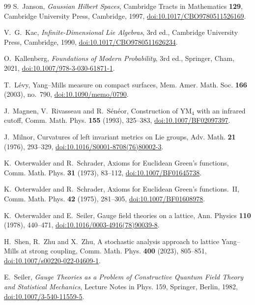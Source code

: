 \begin{thebibliography}{99}
S.~Janson, \emph{Gaussian Hilbert Spaces}, Cambridge Tracts in Mathematics
\textbf{129}, Cambridge University Press, Cambridge, 1997,
\href{https://doi.org/10.1017/CBO9780511526169}{doi:10.1017/CBO9780511526169}.

V.~G.~Kac, \emph{Infinite-Dimensional Lie Algebras}, 3rd ed., Cambridge University Press, Cambridge, 1990, \href{https://doi.org/10.1017/CBO9780511626234}{doi:10.1017/CBO9780511626234}.

O.~Kallenberg, \emph{Foundations of Modern Probability}, 3rd ed., Springer,
Cham, 2021, \href{https://doi.org/10.1007/978-3-030-61871-1}
{doi:10.1007/978-3-030-61871-1}.

T.~L\'evy, Yang--Mills measure on compact surfaces, Mem. Amer. Math. Soc. \textbf{166} (2003), no.~790, \href{https://doi.org/10.1090/memo/0790}{doi:10.1090/memo/0790}.

J.~Magnen, V.~Rivasseau and R.~S\'en\'eor, Construction of YM$_4$ with an infrared cutoff, Comm. Math. Phys. \textbf{155} (1993), 325--383, \href{https://doi.org/10.1007/BF02097397}{doi:10.1007/BF02097397}.

J.~Milnor, Curvatures of left invariant metrics on Lie groups, Adv.
Math. \textbf{21} (1976), 293--329,
\href{https://doi.org/10.1016/S0001-8708(76)80002-3}{doi:10.1016/S0001-8708(76)80002-3}.

K.~Osterwalder and R.~Schrader, Axioms for Euclidean Green's functions,
Comm. Math. Phys. \textbf{31} (1973), 83--112,
\href{https://doi.org/10.1007/BF01645738}{doi:10.1007/BF01645738}.

K.~Osterwalder and R.~Schrader, Axioms for Euclidean Green's functions.~II,
Comm. Math. Phys. \textbf{42} (1975), 281--305,
\href{https://doi.org/10.1007/BF01608978}{doi:10.1007/BF01608978}.

K.~Osterwalder and E.~Seiler, Gauge field theories on a lattice, Ann. Physics
\textbf{110} (1978), 440--471,
\href{https://doi.org/10.1016/0003-4916(78)90039-8}{doi:10.1016/0003-4916(78)90039-8}.

H.~Shen, R.~Zhu and X.~Zhu, A stochastic analysis approach to lattice
Yang--Mills at strong coupling, Comm. Math. Phys. \textbf{400} (2023),
805--851, \href{https://doi.org/10.1007/s00220-022-04609-1}{doi:10.1007/s00220-022-04609-1}.

E.~Seiler, \emph{Gauge Theories as a Problem of Constructive Quantum Field
Theory and Statistical Mechanics}, Lecture Notes in Phys. 159, Springer,
Berlin, 1982, \href{https://doi.org/10.1007/3-540-11559-5}{doi:10.1007/3-540-11559-5}.


\end{thebibliography}
